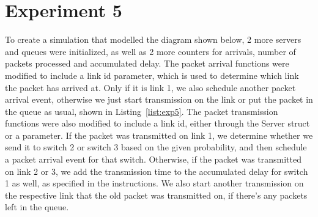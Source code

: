 \section*{Experiment 5}
To create a simulation that modelled the diagram shown below, 2 more servers and queues were initialized, as well as 2 more counters for arrivals, number of packets processed and accumulated delay. The packet arrival functions were modified to include a link id parameter, which is used to determine which link the packet has arrived at. Only if it is link 1, we also schedule another packet arrival event, otherwise we just start transmission on the link or put the packet in the queue as usual, shown in Listing~\ref{list:exp5}. The packet transmission functions were also modified to include a link id, either through the Server struct or a parameter. If the packet was transmitted on link 1, we determine whether we send it to switch 2 or switch 3 based on the given probability, and then schedule a packet arrival event for that switch. Otherwise, if the packet was transmitted on link 2 or 3, we add the transmission time to the accumulated delay for switch 1 as well, as specified in the instructions. We also start another transmission on the respective link that the old packet was transmitted on, if there's any packets left in the queue.

